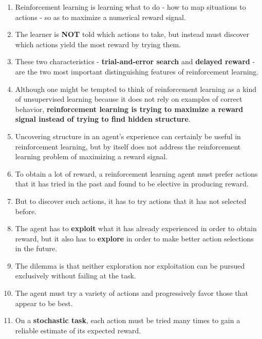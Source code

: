 \begin{enumerate}
    \item Reinforcement learning is learning what to do - how to map situations to actions - so as to maximize a numerical reward signal.

    \item The learner is \textbf{NOT} told which actions to take, but instead must discover which actions yield the most reward by trying them.

    \item These two characteristics - \textbf{trial-and-error search} and \textbf{delayed reward} - are the two most important distinguishing features of reinforcement learning.

    \item  Although one might be tempted to think of reinforcement learning as a kind of unsupervised learning because it does not rely on examples of correct behavior, \textbf{reinforcement learning is trying to maximize a reward signal instead of trying to find hidden structure}. 
    
    \item Uncovering structure in an agent’s experience can certainly be useful in reinforcement learning, but by itself does not address the reinforcement learning problem of maximizing a reward signal.

    \item  To obtain a lot of reward, a reinforcement learning agent must prefer actions that it has tried in the past and found to be elective in producing reward. 
    
    \item But to discover such actions, it has to try actions that it has not selected before. 
    
    \item The agent has to \textbf{exploit} what it has already experienced in order to obtain reward, but it also has to \textbf{explore} in order to make better action selections in the future. 
    
    \item The dilemma is that neither exploration nor exploitation can be pursued exclusively without failing at the task. 
    
    \item The agent must try a variety of actions and progressively favor those that appear to be best. 

    \item On a \textbf{stochastic task}, each action must be tried many times to gain a reliable estimate of its expected reward.


\end{enumerate}
